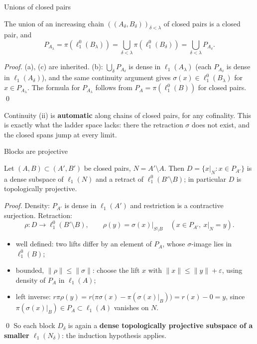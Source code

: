 \documentclass[10pt,aspectratio=169]{beamer}
\newcommand{\lo}[1]{\ell_1^0(#1)}
\newcommand{\ellone}[1]{\ell_1(#1)}
\begin{document}
\begin{frame}{Unions of closed pairs}
  \begin{lemma}[unions]
    The union of an increasing chain ${((A_\delta,B_\delta))}_{\delta<\lambda}$ of
    closed pairs is a closed pair, and
    \[
      P_{A_\lambda}=\pi(\lo{B_\lambda})=\bigcup_{\delta<\lambda}\pi(\lo{B_\delta})=\bigcup_{\delta<\lambda}P_{A_\delta}.
    \]
  \end{lemma}
  \textit{Proof.} (a), (c) are inherited. (b): $\bigcup_\delta P_{A_\delta}$ is
  dense in $\ellone{A_\lambda}$ (each $P_{A_\delta}$ is dense in $\ellone{A_\delta}$),
  and the same continuity argument gives $\sigma(x)\in\lo{B_\lambda}$ for
  $x\in P_{A_\lambda}$. The formula for $P_{A_\lambda}$ follows from
  $P_A=\pi(\lo B)$ for closed pairs. \qed
  \begin{alertblock}{}
    Continuity (ii) is \textbf{automatic} along chains of closed pairs, for
    any cofinality. This is exactly what the ladder space lacks: there the
    retraction $\sigma$ does not exist, and the closed spans jump at every limit.
  \end{alertblock}
\end{frame}

\begin{frame}{Blocks are projective}
  \begin{lemma}
    Let $(A,B)\subset(A',B')$ be closed pairs, $N=A'\setminus A$. Then
    $D=\{x|_N:x\in P_{A'}\}$ is a dense subspace of $\ellone N$ and a retract of
    $\lo{B'\setminus B}$; in particular $D$ is topologically projective.
  \end{lemma}
  \textit{Proof.} Density: $P_{A'}$ is dense in $\ellone{A'}$ and restriction is a
  contractive surjection. Retraction:
  \[
    \rho\colon D\to\lo{B'\setminus B},\qquad \rho(y)=\sigma(x)|_{S\setminus B}
    \quad(x\in P_{A'},\ x|_N=y).
  \]
  \begin{itemize}
    \item well defined: two lifts differ by an element of $P_A$, whose
      $\sigma$-image lies in $\lo B$;
    \item bounded, $\|\rho\|\le\|\sigma\|$: choose the lift $x$ with
      $\|x\|\le\|y\|+\varepsilon$, using density of $P_A$ in $\ellone A$;
    \item left inverse: $r\pi\rho(y)=r\bigl(\pi\sigma(x)-\pi(\sigma(x)|_B)\bigr)=r(x)-0=y$,
      since $\pi(\sigma(x)|_B)\in P_A\subset\ellone A$ vanishes on $N$.
  \end{itemize}
  \qed
  \medskip
  So each block $D_\delta$ is again a \textbf{dense topologically projective
  subspace of a smaller $\ellone{N_\delta}$}: the induction hypothesis applies.
\end{frame}
\end{document}
